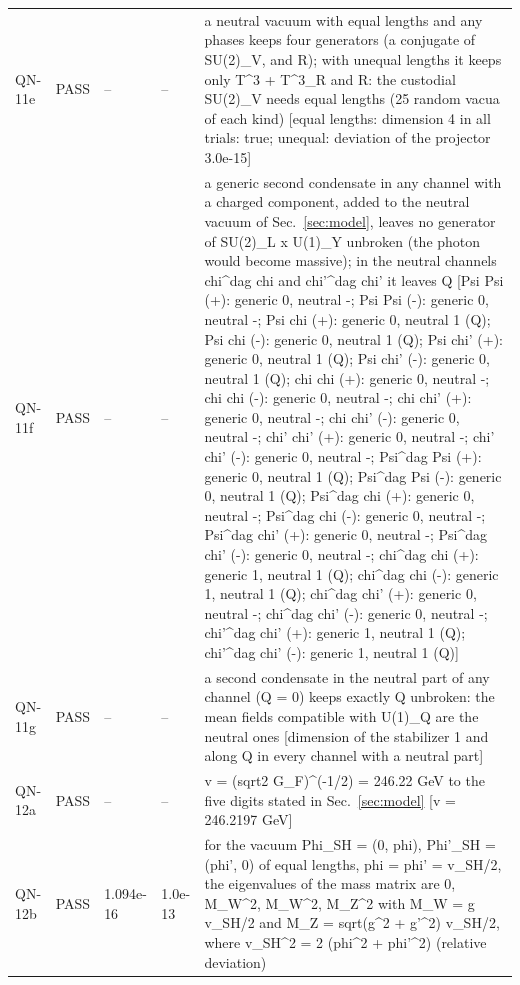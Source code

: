 \documentclass[aps,prd,onecolumn,superscriptaddress,nofootinbib,floatfix,longbibliography]{revtex4-2}
\begin{document}
\begin{longtable}{p{}p{}p{}p{}p{}}
QN-11e & PASS & -- & -- & a neutral vacuum with equal lengths and any phases keeps four generators (a conjugate of SU(2)\_V, and R); with unequal lengths it keeps only T\textasciicircum{}3 + T\textasciicircum{}3\_R and R: the custodial SU(2)\_V needs equal lengths (25 random vacua of each kind) [equal lengths: dimension 4 in all trials: true; unequal: deviation of the projector 3.0e-15] \\
QN-11f & PASS & -- & -- & a generic second condensate in any channel with a charged component, added to the neutral vacuum of Sec.~\ref{sec:model}, leaves no generator of SU(2)\_L x U(1)\_Y unbroken (the photon would become massive); in the neutral channels chi\textasciicircum{}dag chi and chi'\textasciicircum{}dag chi' it leaves Q [Psi Psi (+): generic 0, neutral -; Psi Psi (-): generic 0, neutral -; Psi chi (+): generic 0, neutral 1 (Q); Psi chi (-): generic 0, neutral 1 (Q); Psi chi' (+): generic 0, neutral 1 (Q); Psi chi' (-): generic 0, neutral 1 (Q); chi chi (+): generic 0, neutral -; chi chi (-): generic 0, neutral -; chi chi' (+): generic 0, neutral -; chi chi' (-): generic 0, neutral -; chi' chi' (+): generic 0, neutral -; chi' chi' (-): generic 0, neutral -; Psi\textasciicircum{}dag Psi (+): generic 0, neutral 1 (Q); Psi\textasciicircum{}dag Psi (-): generic 0, neutral 1 (Q); Psi\textasciicircum{}dag chi (+): generic 0, neutral -; Psi\textasciicircum{}dag chi (-): generic 0, neutral -; Psi\textasciicircum{}dag chi' (+): generic 0, neutral -; Psi\textasciicircum{}dag chi' (-): generic 0, neutral -; chi\textasciicircum{}dag chi (+): generic 1, neutral 1 (Q); chi\textasciicircum{}dag chi (-): generic 1, neutral 1 (Q); chi\textasciicircum{}dag chi' (+): generic 0, neutral -; chi\textasciicircum{}dag chi' (-): generic 0, neutral -; chi'\textasciicircum{}dag chi' (+): generic 1, neutral 1 (Q); chi'\textasciicircum{}dag chi' (-): generic 1, neutral 1 (Q)] \\
QN-11g & PASS & -- & -- & a second condensate in the neutral part of any channel (Q = 0) keeps exactly Q unbroken: the mean fields compatible with U(1)\_Q are the neutral ones [dimension of the stabilizer 1 and along Q in every channel with a neutral part] \\
QN-12a & PASS & -- & -- & v = (sqrt2 G\_F)\textasciicircum{}(-1/2) = 246.22 GeV to the five digits stated in Sec.~\ref{sec:model} [v = 246.2197 GeV] \\
QN-12b & PASS & 1.094e-16 & 1.0e-13 & for the vacuum Phi\_SH = (0, phi), Phi'\_SH = (phi', 0) of equal lengths, phi = phi' = v\_SH/2, the eigenvalues of the mass matrix are 0, M\_W\textasciicircum{}2, M\_W\textasciicircum{}2, M\_Z\textasciicircum{}2 with M\_W = g v\_SH/2 and M\_Z = sqrt(g\textasciicircum{}2 + g'\textasciicircum{}2) v\_SH/2, where v\_SH\textasciicircum{}2 = 2 (phi\textasciicircum{}2 + phi'\textasciicircum{}2) (relative deviation) \\

\end{longtable}
\end{document}
